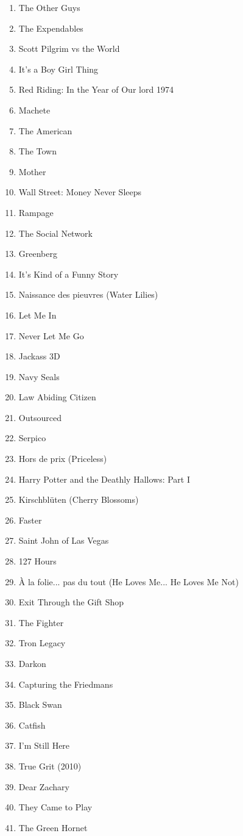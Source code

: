 \documentclass[11pt]{article}
\begin{document}
\begin{enumerate}
\item The Other Guys
\item The Expendables
\item Scott Pilgrim vs the World
\item It's a Boy Girl Thing
\item Red Riding: In the Year of Our lord 1974
\item Machete 
\item The American
\item The Town
\item Mother
\item Wall Street: Money Never Sleeps
\item Rampage
\item The Social Network
\item Greenberg
\item It's Kind of a Funny Story
\item Naissance des pieuvres (Water Lilies)
\item Let Me In
\item Never Let Me Go
\item Jackass 3D
\item Navy Seals
\item Law Abiding Citizen
\item Outsourced
\item Serpico
\item Hors de prix (Priceless)
\item Harry Potter and the Deathly Hallows: Part I
\item Kirschblüten (Cherry Blossoms)
\item Faster
\item Saint John of Las Vegas
\item 127 Hours
\item À la folie... pas du tout (He Loves Me... He Loves Me Not)
\item Exit Through the Gift Shop
\item The Fighter
\item Tron Legacy
\item Darkon
\item Capturing the Friedmans
\item Black Swan
\item Catfish
\item I'm Still Here
\item True Grit (2010)
\item Dear Zachary
\item They Came to Play
\item The Green Hornet

\end{enumerate}
\end{document}
